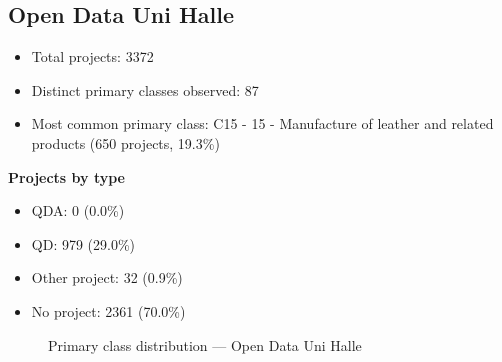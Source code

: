 \subsection{Open Data Uni Halle}

\begin{itemize}
    \item Total projects: 3372
    \item Distinct primary classes observed: 87
    \item Most common primary class: C15 - 15 - Manufacture of leather and related products (650 projects, 19.3\%)
\end{itemize}
\textbf{Projects by type}
\begin{itemize}
    \item QDA: 0 (0.0\%)
    \item QD: 979 (29.0\%)
    \item Other project: 32 (0.9\%)
    \item No project: 2361 (70.0\%)
\end{itemize}

\begin{figure}[h]
    \centering
    
    \caption{Primary class distribution --- Open Data Uni Halle}
\end{figure}


